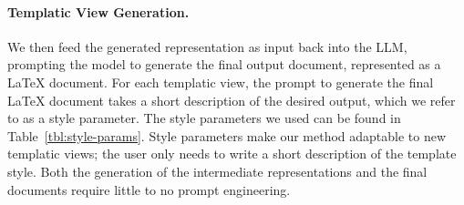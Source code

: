 

\paragraph{Templatic View Generation.} We then feed the generated representation as input back into the LLM, prompting the model to generate the final output document, represented as a LaTeX document. For each templatic view, the prompt to generate the final LaTeX document takes a short description of the desired output, which we refer to as a style parameter. 
The style parameters we used can be found in Table~\ref{tbl:style-params}. Style parameters make our method adaptable to new templatic views; the user only needs to write a short description of the template style. Both the generation of the intermediate representations and the final documents require little to no prompt engineering. 


